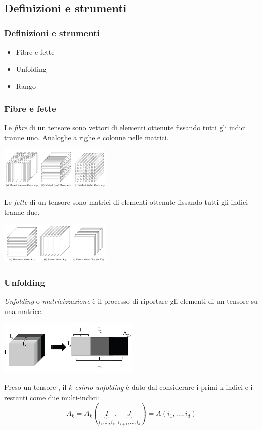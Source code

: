 \documentclass[compress]{beamer}
\theoremstyle{definition}
\theoremstyle{plain}
\begin{document}
\subsection{Definizioni e strumenti}
\begin{frame}
\frametitle{Definizioni e strumenti}
\begin{itemize}
\item Fibre e fette
\item Unfolding
\item Rango
\end{itemize}
\end{frame}

\begin{frame}
\frametitle{Fibre e fette}
Le \emph{fibre} di un tensore sono vettori di elementi ottenute fissando tutti gli indici tranne uno.
Analoghe a righe e colonne nelle matrici.

\begin{center}
	\includegraphics[width=0.4\textwidth]{Img/fibers.jpg}
\end{center}

\pause
Le \emph{fette} di un tensore sono matrici di elementi ottenute fissando tutti gli indici tranne due.

\begin{center}
	\includegraphics[width=0.4\textwidth]{Img/slices.jpg}
\end{center}
\end{frame}

\begin{frame}
\frametitle{Unfolding}
\emph{Unfolding} o \emph{matricizzazione} è il processo di riportare gli elementi di un tensore su una matrice.

\begin{center}
	\includegraphics[width=0.5\textwidth]{Img/unfolding.jpg}
\end{center}

\pause
Preso un tensore \A, il \emph{$k$-esimo unfolding} è dato dal considerare i primi k indici e i restanti come due multi-indici:
\begin{equation*}
	A_k = A_k(
	\underbrace{I}_{i_1,\dots,i_k}
	,
	\underbrace{J}_{i_{k+1},\dots,i_d}
	) = A(i_1,\dots,i_d)	
\end{equation*}
\end{frame}
\end{document}
